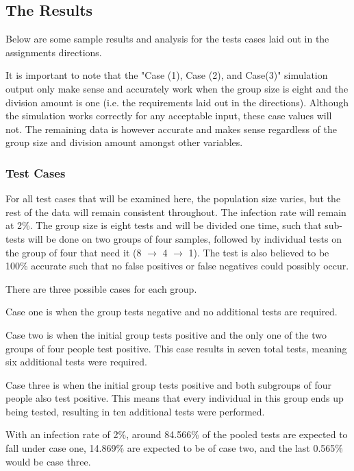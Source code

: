 \documentclass[letterpaper, 10pt,DIV=13]{scrartcl}
\numberwithin{equation}{section} %
\numberwithin{figure}{section} %
\numberwithin{table}{section} %
\begin{document}
\subsection{The Results}

Below are some sample results and analysis for the tests cases laid out in the assignments directions.  

It is important to note that the "Case (1), Case (2), and Case(3)" simulation output only make sense and accurately work when the group size is eight and the division amount is one (i.e. the requirements laid out in the directions).  Although the simulation works correctly for any acceptable input, these case values will not.  The remaining data is however accurate and makes sense regardless of the group size and division amount amongst other variables.

\subsubsection{Test Cases}

For all test cases that will be examined here, the population size varies, but the rest of the data will remain consistent throughout.  The infection rate will remain at 2\%.  The group size is eight tests and will be divided one time, such that sub-tests will be done on two groups of four samples, followed by individual tests on the group of four that need it (8 $\rightarrow$ 4 $\rightarrow$ 1).  The test is also believed to be 100\% accurate such that no false positives or false negatives could possibly occur.

There are three possible cases for each group.  

Case one is when the group tests negative and no additional tests are required.  

Case two is when the initial group tests positive and the only one of the two groups of four people test positive.  This case results in seven total tests, meaning six additional tests were required.  

Case three is when the initial group tests positive and both subgroups of four people also test positive.  This means that every individual in this group ends up being tested, resulting in ten additional tests were performed.

With an infection rate of 2\%, around 84.566\% of the pooled tests are expected to fall under case one, 14.869\% are expected to be of case two, and the last 0.565\% would be case three.
\end{document}
